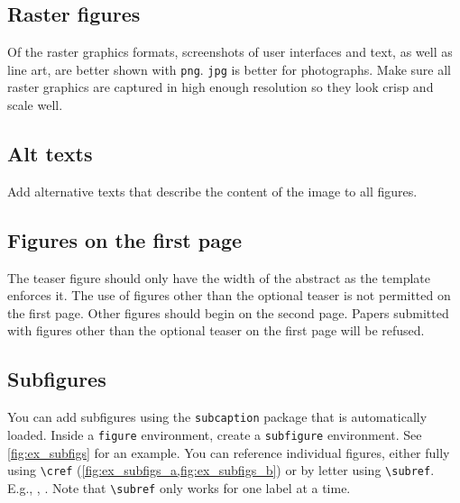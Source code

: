 \documentclass[journal]{vgtc}                     %
\begin{document}
\subsection{Raster figures}

Of the raster graphics formats, screenshots of user interfaces and text, as well as line art, are better shown with \texttt{png}.
\texttt{jpg} is better for photographs.
Make sure all raster graphics are captured in high enough resolution so they look crisp and scale well.

\subsection{Alt texts}

Add alternative texts that describe the content of the image to all figures.

\subsection{Figures on the first page}

The teaser figure should only have the width of the abstract as the template enforces it.
The use of figures other than the optional teaser is not permitted on the first page.
Other figures should begin on the second page.
Papers submitted with figures other than the optional teaser on the first page will be refused.

\subsection{Subfigures}

You can add subfigures using the \texttt{subcaption} package that is automatically loaded.
Inside a \verb|figure| environment, create a \verb|subfigure| environment.
See \cref{fig:ex_subfigs} for an example.
You can reference individual figures, either fully using \verb|\cref| (\cref{fig:ex_subfigs_a,fig:ex_subfigs_b}) or by letter using \verb|\subref|.
E.g., , .
Note that \verb|\subref| only works for one label at a time.
\end{document}
